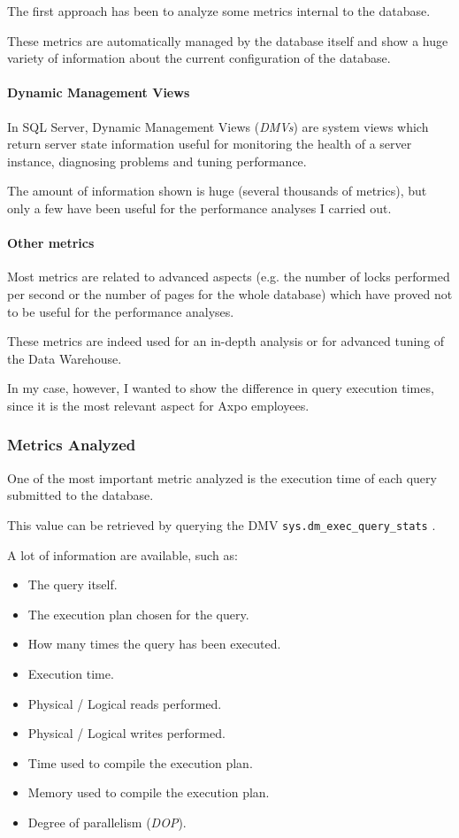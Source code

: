 The first approach has been to analyze some metrics internal to the database.

These metrics are automatically managed by the database itself and show a huge variety of information about the current configuration of the database.

\paragraph{Dynamic Management Views}
    In SQL Server, Dynamic Management Views (\textit{DMVs}) are system views which return server state information useful for monitoring the health of a server instance, diagnosing problems and tuning performance.
    
    The amount of information shown is huge (several thousands of metrics), but only a few have been useful for the performance analyses I carried out.
    
\paragraph{Other metrics}
    Most metrics are related to advanced aspects (e.g. the number of locks performed per second or the number of pages for the whole database) which have proved not to be useful for the performance analyses.
    
    These metrics are indeed used for an in-depth analysis or for advanced tuning of the Data Warehouse.
    
    In my case, however, I wanted to show the difference in query execution times, since it is the most relevant aspect for Axpo employees.

\subsubsection{Metrics Analyzed}
    One of the most important metric analyzed is the execution time of each query submitted to the database.
    
    This value can be retrieved by querying the DMV \texttt{sys.dm\_exec\_query\_stats} \cite{bib:tests:perf:dmv_doc}.
    
    A lot of information are available, such as:
    \begin{itemize}
        \item The query itself.
        \item The execution plan chosen for the query.
        \item How many times the query has been executed.
        \item Execution time.
        \item Physical / Logical reads performed.
        \item Physical / Logical writes performed.
        \item Time used to compile the execution plan.
        \item Memory used to compile the execution plan.
        \item Degree of parallelism (\textit{DOP}).
    \end{itemize}
    
